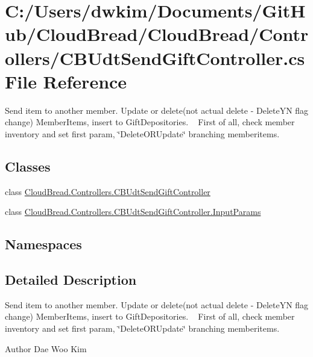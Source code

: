 \hypertarget{a00233}{}\section{C\+:/\+Users/dwkim/\+Documents/\+Git\+Hub/\+Cloud\+Bread/\+Cloud\+Bread/\+Controllers/\+C\+B\+Udt\+Send\+Gift\+Controller.cs File Reference}
\label{a00233}


Send item to another member. Update or delete(not actual delete -\/ Delete\+YN flag change) Member\+Items, insert to Gift\+Depositories. ~\newline
First of all, check member inventory and set first param, \char`\"{}\+Delete\+O\+R\+Update\char`\"{} branching memberitems.  


\subsection*{Classes}
\begin{DoxyCompactItemize}
\item 
class \hyperlink{a00063}{Cloud\+Bread.\+Controllers.\+C\+B\+Udt\+Send\+Gift\+Controller}
\item 
class \hyperlink{a00116}{Cloud\+Bread.\+Controllers.\+C\+B\+Udt\+Send\+Gift\+Controller.\+Input\+Params}
\end{DoxyCompactItemize}
\subsection*{Namespaces}
\begin{DoxyCompactItemize}
\end{DoxyCompactItemize}


\subsection{Detailed Description}
Send item to another member. Update or delete(not actual delete -\/ Delete\+YN flag change) Member\+Items, insert to Gift\+Depositories. ~\newline
First of all, check member inventory and set first param, \char`\"{}\+Delete\+O\+R\+Update\char`\"{} branching memberitems. 

\begin{DoxyAuthor}{Author}
Dae Woo Kim 
\end{DoxyAuthor}

